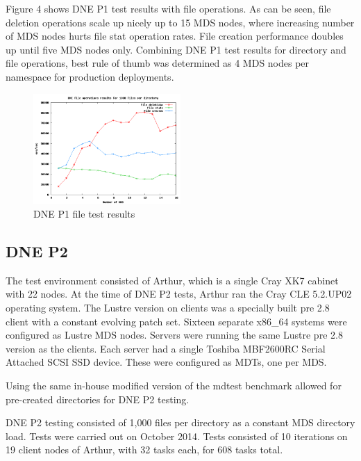\documentclass[conference,compsoc]{IEEEtran}
\begin{document}
Figure 4 shows DNE P1 test results with file operations. As can be seen,
file deletion operations scale up nicely up to 15 MDS nodes, where increasing
number of MDS nodes hurts file stat operation rates. File creation performance
doubles up until five MDS nodes only.  Combining DNE P1 test results for
directory and file operations, best rule of thumb was determined as 4 MDS nodes
per namespace for production deployments.


\begin{figure}[!ht]
  \centering
    \includegraphics[width=0.5\textwidth]{figs/dnep1_file_results}
  \caption{DNE P1 file test results}
\end{figure}
 


\subsection{DNE P2}

The test environment consisted of Arthur, which is a single Cray XK7 cabinet with
22 nodes. At the time of DNE P2 tests, Arthur ran the Cray CLE 5.2.UP02
operating system. The Lustre version on clients was a specially built pre 2.8
client with a constant evolving patch set. Sixteen separate x86\_64 systems were
configured as Lustre MDS nodes. Servers were running the same Lustre pre 2.8
version as the clients. Each server had a single Toshiba MBF2600RC Serial
Attached SCSI SSD device. These were configured as MDTs, one per MDS. 

Using the same in-house modified version of the mdtest benchmark allowed for
pre-created directories for DNE P2 testing.


DNE P2 testing consisted of 1,000 files per directory as a constant MDS
directory load. Tests were carried out on October 2014. Tests consisted of 10
iterations on 19 client nodes of Arthur, with 32 tasks each, for 608 tasks total.
\end{document}
